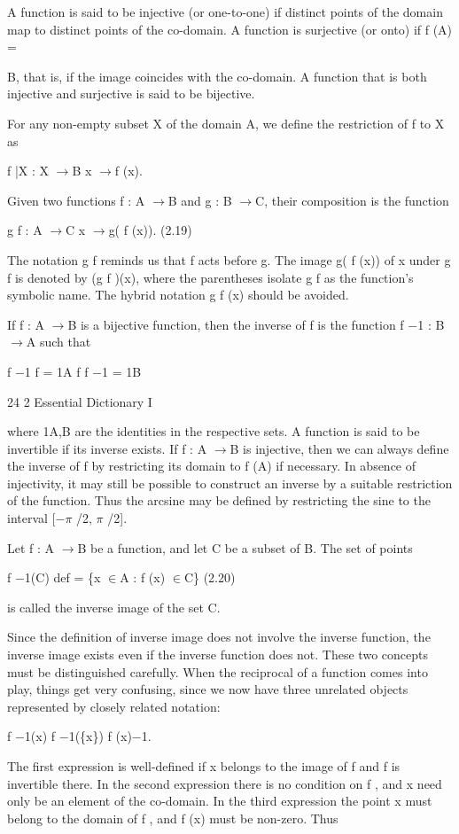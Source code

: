 \documentclass[11pt]{article}
\theoremstyle{plain}
\theoremstyle{definition}
\begin{document}
A function is said to be injective (or one-to-one) if distinct points of the domain map to distinct points of the co-domain. A function is surjective (or onto) if f (A) =

B, that is, if the image coincides with the co-domain. A function that is both injective and surjective is said to be bijective.

For any non-empty subset X of the domain A, we define the restriction of f to X as

f |X : X $\to$B x $\to$f (x).

Given two functions f : A $\to$B and g : B $\to$C, their composition is the function

g f : A $\to$C x $\to$g( f (x)). (2.19)

The notation g f reminds us that f acts before g. The image g( f (x)) of x under g f is denoted by (g f )(x), where the parentheses isolate g f as the function's symbolic name. The hybrid notation g f (x) should be avoided.

If f : A $\to$B is a bijective function, then the inverse of f is the function f $-$1 : B $\to$A such that

f $-$1 f = 1A f f $-$1 = 1B

24 2 Essential Dictionary I

where 1A,B are the identities in the respective sets. A function is said to be invertible if its inverse exists. If f : A $\to$B is injective, then we can always define the inverse of f by restricting its domain to f (A) if necessary. In absence of injectivity, it may still be possible to construct an inverse by a suitable restriction of the function. Thus the arcsine may be defined by restricting the sine to the interval [$-$$\pi$ /2, $\pi$ /2].

Let f : A $\to$B be a function, and let C be a subset of B. The set of points

f $-$1(C) def = \{x $\in$A : f (x) $\in$C\} (2.20)

is called the inverse image of the set C.

Since the definition of inverse image does not involve the inverse function, the inverse image exists even if the inverse function does not. These two concepts must be distinguished carefully. When the reciprocal of a function comes into play, things get very confusing, since we now have three unrelated objects represented by closely related notation:

f $-$1(x) f $-$1(\{x\}) f (x)$-$1.

The first expression is well-defined if x belongs to the image of f and f is invertible there. In the second expression there is no condition on f , and x need only be an element of the co-domain. In the third expression the point x must belong to the domain of f , and f (x) must be non-zero. Thus
\end{document}
